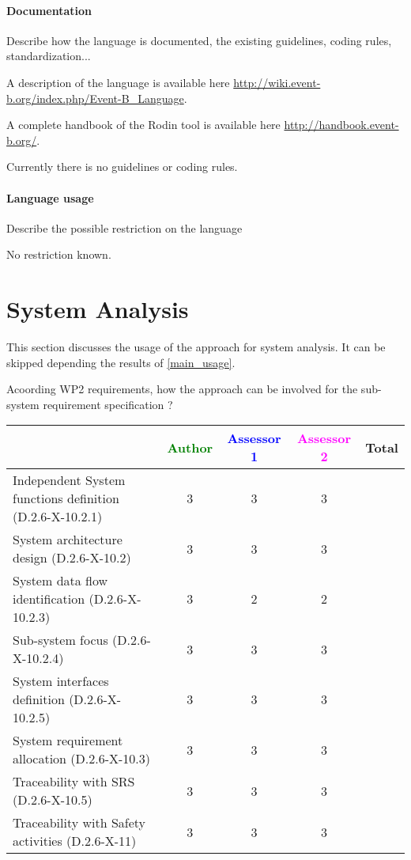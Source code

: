 \paragraph{Documentation} Describe how the language is documented, the existing guidelines, coding rules, standardization...

\begin{author_comment}
A description of the language is available here \url{http://wiki.event-b.org/index.php/Event-B_Language}.

A complete handbook of the Rodin tool is available  here \url{http://handbook.event-b.org/}.

Currently there is no guidelines or coding rules.
\end{author_comment}

\paragraph{Language usage} Describe the possible restriction on the language

\begin{author_comment}
No restriction known.
\end{author_comment}

\section{System Analysis}
This section discusses the usage of the approach for system analysis.
It can be skipped depending the results of \ref{main_usage}.

Acoording WP2 requirements, how the approach can be involved for the sub-system requirement specification ?

\begin{tabular}{|l | c | c | c | c|}
\hline
& \textcolor{green}{Author} & \textcolor{blue}{Assessor 1} & \textcolor{magenta}{Assessor 2} & Total \\
\hline
Independent System functions definition (D.2.6-X-10.2.1)  & 3 & 3 & 3 &  \\
\hline 
System architecture design (D.2.6-X-10.2) & 3 & 3 & 3 &  \\
\hline
System data flow identification (D.2.6-X-10.2.3)  & 3 & 2 & 2 &  \\
\hline
Sub-system focus (D.2.6-X-10.2.4)  & 3 & 3 & 3 &  \\
\hline
System interfaces definition (D.2.6-X-10.2.5)  & 3 & 3 & 3 &  \\
\hline
System requirement allocation (D.2.6-X-10.3)  & 3 & 3 & 3 &  \\
\hline
Traceability with SRS (D.2.6-X-10.5)  & 3 & 3 & 3 &  \\
\hline
Traceability with Safety activities (D.2.6-X-11)  & 3 & 3 & 3 &  \\
\hline
\end{tabular}

